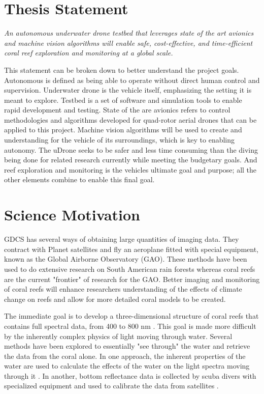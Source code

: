 \section{Thesis Statement}
\begin{center}
    \emph{An autonomous underwater drone testbed that leverages state of the art avionics and machine vision algorithms will enable safe, cost-effective, and time-efficient coral reef exploration and monitoring at a global scale.}
\end{center}
This statement can be broken down to better understand the project goals. Autonomous is defined as being able to operate without direct human control and supervision. Underwater drone is the vehicle itself, emphasizing the setting it is meant to explore. Testbed is a set of software and simulation tools to enable rapid development and testing. State of the are avionics refers to control methodologies and algorithms developed for quad-rotor aerial drones that can be applied to this project. Machine vision algorithms will be used to create and understanding for the vehicle of its surroundings, which is key to enabling autonomy. The uDrone seeks to be safer and less time consuming than the diving being done for related research currently while meeting the budgetary goals. And reef exploration and monitoring is the vehicles ultimate goal and purpose; all the other elements combine to enable this final goal. 

\section{Science Motivation}

GDCS has several ways of obtaining large quantities of imaging data. They contract with Planet satellites and fly an aeroplane fitted with special equipment, known as the Global Airborne Observatory (GAO). These methods have been used to do extensive research on South American rain forests whereas coral reefs are the current "frontier" of research for the GAO. Better imaging and monitoring of coral reefs will enhance researchers understanding of the effects of climate change on reefs and allow for more detailed coral models to be created. 

The immediate goal is to develop a three-dimensional structure of coral reefs that contains full spectral data, from 400 to 800 nm \parencite{gdcs_sat}. This goal is made more difficult by the inherently complex physics of light moving through water. Several methods have been explored to essentially "see through" the water and retrieve the data from the coral alone. In one approach, the inherent properties of the water are used to calculate the effects of the water on the light spectra moving through it \parencite{gdcs_gao}. In another, bottom reflectance data is collected by scuba divers with specialized equipment and used to calibrate the data from satellites \parencite{gdcs_ads}. 

